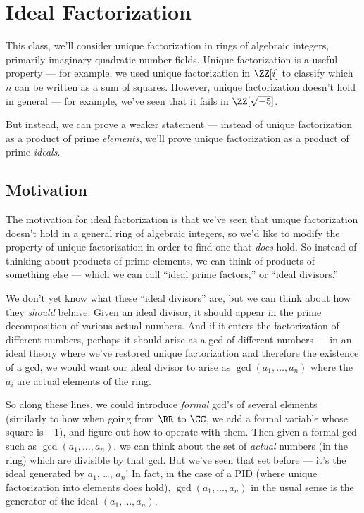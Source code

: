 

\section{Ideal Factorization}

This class, we'll consider unique factorization in rings of algebraic integers, primarily imaginary quadratic number fields. Unique factorization is a useful property --- for example, we used unique factorization in $\ZZ[i]$ to classify which $n$ can be written as a sum of squares. However, unique factorization doesn't hold in general --- for example, we've seen that it fails in $\ZZ[\sqrt{-5}]$. 

But instead, we can prove a weaker statement --- instead of unique factorization as a product of prime \emph{elements}, we'll prove unique factorization as a product of prime \emph{ideals}. 

\subsection{Motivation}

The motivation for ideal factorization is that we've seen that unique factorization doesn't hold in a general ring of algebraic integers, so we'd like to modify the property of unique factorization in order to find one that \emph{does} hold. So instead of thinking about products of prime elements, we can think of products of something else --- which we can call ``ideal prime factors,'' or ``ideal divisors.'' 

We don't yet know what these ``ideal divisors'' are, but we can think about how they \emph{should} behave. Given an ideal divisor, it should appear in the prime decomposition of various actual numbers. And if it enters the factorization of different numbers, perhaps it should arise as a gcd of different numbers --- in an ideal theory where we've restored unique factorization and therefore the existence of a gcd, we would want our ideal divisor to arise as $\gcd(a_1, \ldots, a_n)$ where the $a_i$ are actual elements of the ring.

So along these lines, we could introduce \emph{formal} gcd's of several elements (similarly to how when going from $\RR$ to $\CC$, we add a formal variable whose square is $-1$), and figure out how to operate with them. Then given a formal gcd such as $\gcd(a_1, \ldots, a_n)$, we can think about the set of \emph{actual} numbers (in the ring) which are divisible by that gcd. But we've seen that set before --- it's the ideal generated by $a_1$, \ldots, $a_n$! In fact, in the case of a PID (where unique factorization into elements does hold), $\gcd(a_1, \ldots, a_n)$ in the usual sense is the generator of the ideal $(a_1, \ldots, a_n)$. 


